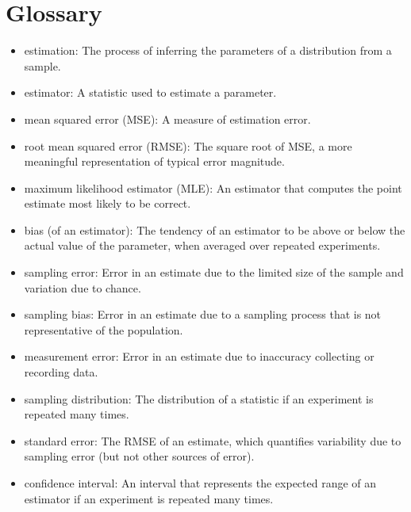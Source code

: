\section{Glossary}

\begin{itemize}

\item estimation: The process of inferring the parameters of a distribution
from a sample.

\item estimator: A statistic used to estimate a parameter.

\item mean squared error (MSE): A measure of estimation error.

\item root mean squared error (RMSE): The square root of MSE,
a more meaningful representation of typical error magnitude.

\item maximum likelihood estimator (MLE): An estimator that computes the
point estimate most likely to be correct.

\item bias (of an estimator): The tendency of an estimator to be above or
  below the actual value of the parameter, when averaged over repeated
  experiments.  

\item sampling error: Error in an estimate due to the limited
  size of the sample and variation due to chance. 

\item sampling bias: Error in an estimate due to a sampling process
  that is not representative of the population. 

\item measurement error: Error in an estimate due to inaccuracy collecting
  or recording data. 

\item sampling distribution: The distribution of a statistic if an
  experiment is repeated many times.  

\item standard error: The RMSE of an estimate,
which quantifies variability due to sampling error (but not
other sources of error).

\item confidence interval: An interval that represents the expected
  range of an estimator if an experiment is repeated many times.
   

\end{itemize}
